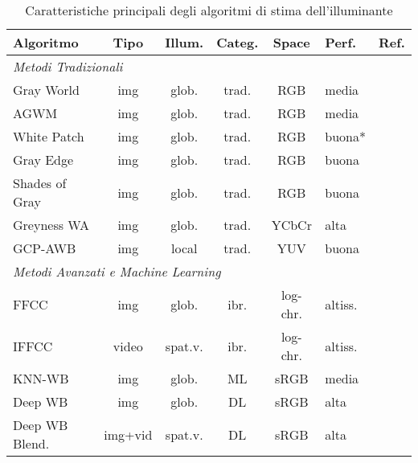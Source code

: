 \begin{table}[htbp]
\centering
\caption{Caratteristiche principali degli algoritmi di stima dell'illuminante}
\label{tab:algorithms}
\footnotesize
\begin{tabularx}{\textwidth}{lccccXl}
\toprule
\textbf{Algoritmo} & \textbf{Tipo} & \textbf{Illum.} & \textbf{Categ.} & \textbf{Space} & \textbf{Perf.} & \textbf{Ref.} \\
\midrule
\multicolumn{7}{l}{\textit{Metodi Tradizionali}} \\
\midrule
Gray World & img & glob. & trad. & RGB & media & \cite{zapryanov_automatic_2012} \\
AGWM & img & glob. & trad. & RGB & media & \cite{weng_novel_2005} \\
White Patch & img & glob. & trad. & RGB & buona* & \cite{zapryanov_automatic_2012} \\
Gray Edge & img & glob. & trad. & RGB & buona & \cite{van_de_weijer_edge-based_2007} \\
Shades of Gray & img & glob. & trad. & RGB & buona & \cite{zapryanov_automatic_2012} \\
Greyness WA & img & glob. & trad. & YCbCr & alta & \cite{thai_fast_2016} \\
GCP-AWB & img & local & trad. & YUV & buona & \cite{huo_robust_2006} \\
\midrule
\multicolumn{7}{l}{\textit{Metodi Avanzati e Machine Learning}} \\
\midrule
FFCC & img & glob. & ibr. & log-chr. & altiss. & \cite{barron_fast_2017} \\
IFFCC & video & spat.v. & ibr. & log-chr. & altiss. & \cite{wei_integral_2025} \\
KNN-WB & img & glob. & ML & sRGB & media & \cite{afifi_deep_2020} \\
Deep WB & img & glob. & DL & sRGB & alta & \cite{afifi_deep_2020} \\
Deep WB Blend. & img+vid & spat.v. & DL & sRGB & alta & \cite{afifi_auto_2022} \\
\bottomrule
\end{tabularx}
\end{table}

